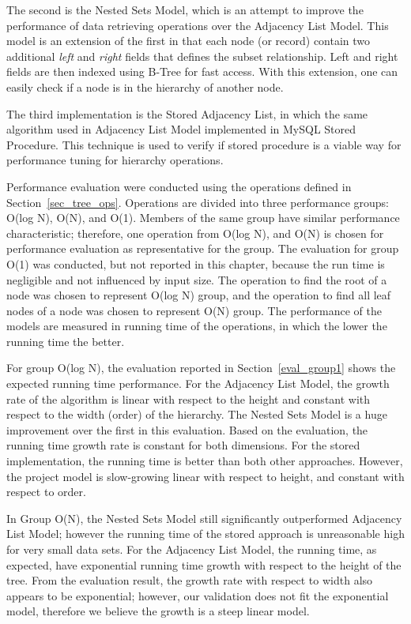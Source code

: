 The second is the Nested Sets Model, which is an attempt to improve the performance of data retrieving operations over the Adjacency List Model. This model is an extension of the first in that each node (or record) contain two additional {\em left} and {\em right} fields that defines the subset relationship. Left and right fields are then indexed using B-Tree for fast access. With this extension, one can easily check if a node is in the hierarchy of another node.

The third implementation is the Stored Adjacency List, in which the same algorithm used in Adjacency List Model implemented in MySQL Stored Procedure. This technique is used to verify if stored procedure is a viable way for performance tuning for hierarchy operations.

Performance evaluation were conducted using the operations defined in Section~\ref{sec_tree_ops}. Operations are divided into three performance groups: O(log N), O(N), and O(1). Members of the same group have similar performance characteristic; therefore, one operation from O(log N), and O(N) is chosen for performance evaluation as representative for the group. The evaluation for group O(1) was conducted, but not reported in this chapter, because the run time is negligible and not influenced by input size. The operation to find the root of a node was chosen to represent O(log N) group, and the operation to find all leaf nodes of a node was chosen to represent O(N) group. The performance of the models are measured in running time of the operations, in which the lower the running time the better.

For group O(log N), the evaluation reported in Section~\ref{eval_group1} shows the expected running time performance. For the Adjacency List Model, the growth rate of the algorithm is linear with respect to the height and constant with respect to the width (order) of the hierarchy. The Nested Sets Model is a huge improvement over the first in this evaluation. Based on the evaluation, the running time growth rate is constant for both dimensions. For the stored implementation, the running time is better than both other approaches. However, the project model is slow-growing linear with respect to height, and constant with respect to order.

In Group O(N), the Nested Sets Model still significantly outperformed Adjacency List Model; however the running time of the stored approach is unreasonable high for very small data sets. For the Adjacency List Model, the running time, as expected, have exponential running time growth with respect to the height of the tree. From the evaluation result, the growth rate with respect to width also appears to be exponential; however, our validation does not fit the exponential model, therefore we believe the growth is a steep linear model.

